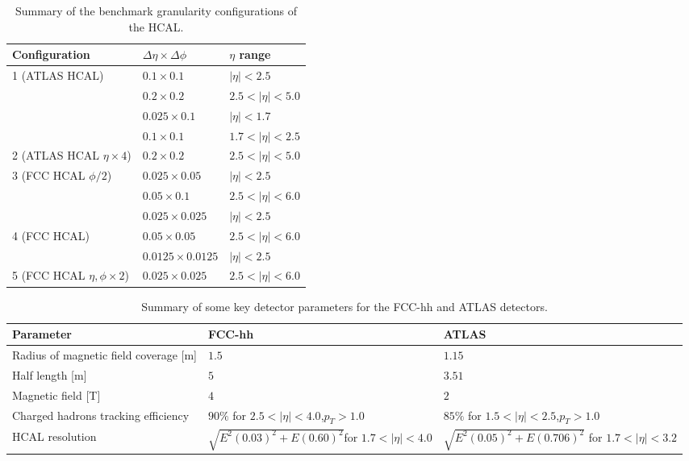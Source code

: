 \begin{table}
	\centering
	\caption{Summary of the benchmark granularity configurations of the HCAL.}
	\begin{tabular}{lll}
		\toprule 
		\textbf{Configuration} & $\Delta \eta \times \Delta \phi$ & $\eta$ range\\
		\midrule
		\multirow{2}{*}{1 (ATLAS HCAL)} & $0.1\times 0.1$  & $|\eta|<2.5$\\
		& $0.2\times 0.2$ & $2.5<|\eta|<5.0$ \\
		\cellcolor{black!7} &\cellcolor{black!7} $0.025\times 0.1$  & \cellcolor{black!7}$|\eta|<1.7$\\
		\cellcolor{black!7} & \cellcolor{black!7}$0.1\times 0.1$  & \cellcolor{black!7}$1.7<|\eta|<2.5$\\
		\multirow{-3}{*}{2 (ATLAS HCAL $\eta\times 4$)} \cellcolor{black!7}& \cellcolor{black!7}$0.2\times 0.2$  &\cellcolor{black!7} $2.5<|\eta|<5.0$\\
		\multirow{2}{*}{3 (FCC HCAL $\phi/2 $)}& $0.025\times0.05$ & $|\eta|<2.5$\\
		& $0.05\times 0.1$ & $2.5<|\eta|<6.0$ \\
		 \cellcolor{black!7}&  \cellcolor{black!7}$0.025\times0.025$ &  \cellcolor{black!7}$|\eta|<2.5$\\
		 \multirow{-2}{*}{4 (FCC HCAL)}\cellcolor{black!7}&  \cellcolor{black!7}$0.05\times 0.05$ & \cellcolor{black!7} $2.5<|\eta|<6.0$ \\
		& $0.0125\times0.0125$ &$|\eta|<2.5$\\
		\multirow{-2}{*}{5 (FCC HCAL $\eta,\phi\times 2$)}&$0.025\times 0.025$ & $2.5<|\eta|<6.0$\\
		\bottomrule
	\end{tabular}
	\label{table:Gran}
\end{table}

\begin{table}
	\centering
	\caption{Summary of some key detector parameters for the FCC-hh and ATLAS detectors.}
	\begin{tabular}{p{40mm}p{40mm}p{40mm}}
		\toprule 
		\textbf{Parameter} & FCC-hh & ATLAS\\
		\midrule
		Radius of magnetic field coverage [m]& $1.5$& $1.15$  \\
		\cellcolor{black!7}Half length [m] &\cellcolor{black!7} $5$&\cellcolor{black!7} $3.51$\\
		Magnetic field [T]& $4$& $2$\\
		\cellcolor{black!7}Charged hadrons tracking efficiency &\cellcolor{black!7} $90\%$ for $2.5<|\eta|<4.0$,\linebreak$ p_T>1.0$&\cellcolor{black!7} $85\%$ for $1.5<|\eta|<2.5$,\linebreak$p_T>1.0$\\
		HCAL resolution & $\sqrt{E^2(0.03)^2+E(0.60)^2}$\linebreak for $1.7<|\eta|<4.0$& $\sqrt{E^2(0.05)^2+E(0.706)^2}$ \linebreak for $1.7<|\eta|<3.2$\\
		\bottomrule
	\end{tabular}
	\label{table:det}
\end{table}

